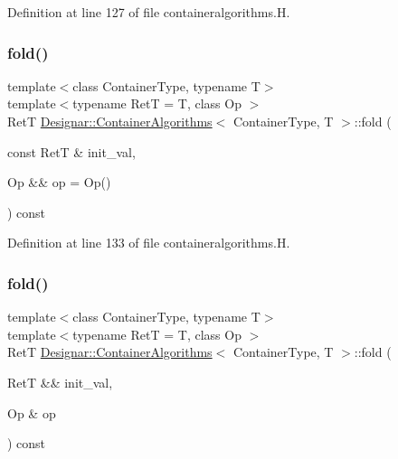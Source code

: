 Definition at line 127 of file containeralgorithms.\+H.

\mbox{\label{class_designar_1_1_container_algorithms_a410f880dab4f206d3d99b31b0a67637d}} 
\subsubsection{\texorpdfstring{fold()}{fold()}\hspace{0.1cm}{\footnotesize\ttfamily [2/4]}}
{\footnotesize\ttfamily template$<$class Container\+Type, typename T$>$ \\
template$<$typename RetT  = T, class Op $>$ \\
RetT \hyperlink{class_designar_1_1_container_algorithms}{Designar\+::\+Container\+Algorithms}$<$ Container\+Type, T $>$\+::fold (\begin{DoxyParamCaption}\item[{const RetT \&}]{init\+\_\+val,  }\item[{Op \&\&}]{op = {\ttfamily Op()} }\end{DoxyParamCaption}) const\hspace{0.3cm}{\ttfamily [inline]}}



Definition at line 133 of file containeralgorithms.\+H.

\mbox{\label{class_designar_1_1_container_algorithms_a148e3417520a3253663bd2554cad6c67}} 
\subsubsection{\texorpdfstring{fold()}{fold()}\hspace{0.1cm}{\footnotesize\ttfamily [3/4]}}
{\footnotesize\ttfamily template$<$class Container\+Type, typename T$>$ \\
template$<$typename RetT  = T, class Op $>$ \\
RetT \hyperlink{class_designar_1_1_container_algorithms}{Designar\+::\+Container\+Algorithms}$<$ Container\+Type, T $>$\+::fold (\begin{DoxyParamCaption}\item[{RetT \&\&}]{init\+\_\+val,  }\item[{Op \&}]{op }\end{DoxyParamCaption}) const\hspace{0.3cm}{\ttfamily [inline]}}



